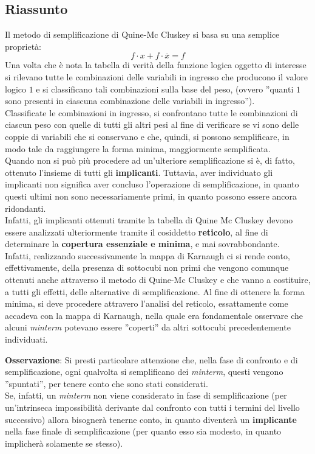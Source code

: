 \documentclass[a4paper]{extarticle}
\newcommand{\quotes}[1]{''#1''}
\begin{document}
\subsection{Riassunto}
Il metodo di semplificazione di Quine-Mc Cluskey si basa su una semplice proprietà:
\[f \cdot x + f \cdot \overline{x} = f\]
Una volta che è nota la tabella di verità della funzione logica oggetto di interesse si rilevano tutte le combinazioni delle variabili in ingresso che producono il valore logico \(1\) e si classificano tali combinazioni sulla base del peso, (ovvero \quotes{quanti \(1\) sono presenti in ciascuna combinazione delle variabili in ingresso}).\\
Classificate le combinazioni in ingresso, si confrontano tutte le combinazioni di ciascun peso con quelle di tutti gli altri pesi al fine di verificare se vi sono delle coppie di variabili che si conservano e che, quindi, si possono semplificare, in modo tale da raggiungere la forma minima, maggiormente semplificata.\\
Quando non si può più procedere ad un'ulteriore semplificazione si è, di fatto, ottenuto l'insieme di tutti gli \textbf{implicanti}. Tuttavia, aver individuato gli implicanti non significa aver concluso l'operazione di semplificazione, in quanto questi ultimi non sono necessariamente primi, in quanto possono essere ancora ridondanti.\\
Infatti, gli implicanti ottenuti tramite la tabella di Quine Mc Cluskey devono essere analizzati ulteriormente tramite il cosiddetto \textbf{reticolo}, al fine di determinare la \textbf{copertura essenziale e minima}, e mai sovrabbondante.\\
Infatti, realizzando successivamente la mappa di Karnaugh ci si rende conto, effettivamente, della presenza di sottocubi non primi che vengono comunque ottenuti anche attraverso il metodo di Quine-Mc Cluskey e che vanno a costituire, a tutti gli effetti, delle alternative di semplificazione. Al fine di ottenere la forma minima, si deve procedere attravero l'analisi del reticolo, essattamente come accadeva con la mappa di Karnaugh, nella quale era fondamentale osservare che alcuni \textit{minterm} potevano essere \quotes{coperti} da altri sottocubi precedentemente individuati.

\vspace{1em}
\noindent
\textbf{Osservazione}: Si presti particolare attenzione che, nella fase di confronto e di semplificazione, ogni qualvolta si semplificano dei \textit{minterm}, questi vengono \quotes{spuntati}, per tenere conto che sono stati considerati.\\
Se, infatti, un \textit{minterm} non viene considerato in fase di semplificazione (per un'intrinseca impossibilità derivante dal confronto con tutti i termini del livello successivo) allora bisognerà tenerne conto, in quanto diventerà un \textbf{implicante} nella fase finale di semplificazione (per quanto esso sia modesto, in quanto implicherà solamente se stesso).
\end{document}
